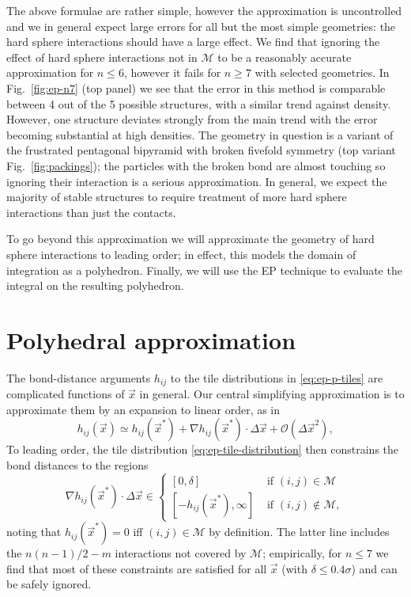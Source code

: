 \documentclass[11pt,twoside]{report}
\begin{document}
The above formulae are rather simple, however the approximation is uncontrolled and we in general expect large errors for all but the most simple geometries: the hard sphere interactions should have a large effect.
We find that ignoring the effect of hard sphere interactions not in $\mathcal{M}$ to be a reasonably accurate approximation for $n \le 6$, however it fails for $n \ge 7$ with selected geometries.
In Fig.\ \ref{fig:ep-n7} (top panel) we see that the error in this method is comparable between 4 out of the 5 possible structures, with a similar trend against density.
However, one structure deviates strongly from the main trend with the error becoming substantial at high densities.
The geometry in question is a variant of the frustrated pentagonal bipyramid with broken fivefold symmetry (top variant Fig.\ \ref{fig:packings}); the particles with the broken bond are almost touching so ignoring their interaction is a serious approximation.
In general, we expect the majority of stable structures to require treatment of more hard sphere interactions than just the contacts.

To go beyond this approximation we will approximate the geometry of hard sphere interactions to leading order; in effect, this models the domain of integration as a polyhedron.
Finally, we will use the EP technique to evaluate the integral on the resulting polyhedron.

\section{Polyhedral approximation}
\label{sec:polyhedral-approximation}

The bond-distance arguments $h_{ij}$ to the tile distributions in \eqref{eq:ep-p-tiles} are complicated functions of $\vec{x}$ in general.
Our central simplifying approximation is to approximate them by an expansion to linear order, as in
\begin{equation*}
  h_{ij}(\vec{x})
  \simeq
  h_{ij}(\vec{x}^*)
  + \nabla h_{ij}(\vec{x}^*) \cdot \Delta \vec{x}
  + \mathcal{O}(\Delta \vec{x}^2),
\end{equation*}
To leading order, the tile distribution \eqref{eq:ep-tile-distribution} then constrains the bond distances to the regions
\begin{equation*}
  \nabla h_{ij}(\vec{x}^*) \cdot \Delta \vec{x}
  \in
  \begin{cases}
    [0, \delta] & \textrm{ if } (i,j) \in \mathcal{M} \\
    [-h_{ij}(\vec{x}^*), \infty] & \textrm{ if } (i,j) \notin \mathcal{M},
  \end{cases}
\end{equation*}
noting that $h_{ij}(\vec{x}^*) = 0$ iff $(i,j) \in \mathcal{M}$ by definition.
The latter line includes the $n(n-1)/2 - m$ interactions not covered by $\mathcal{M}$; empirically, for $n \le 7$ we find that most of these constraints are satisfied for all $\vec{x}$ (with $\delta \le 0.4\sigma$) and can be safely ignored.
\end{document}
